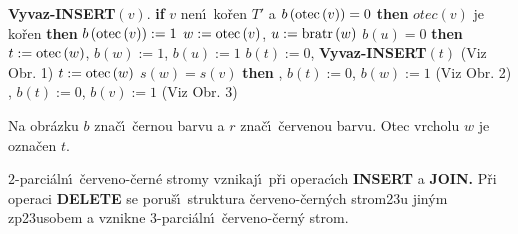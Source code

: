 {\bf Vyvaz-INSERT$\left(v\right)$}.\newline 
{\bf if} $v$ nen\'\i\ ko\v ren $T'$ a $b\left(\operatorname{otec}\left(v\right)\right)=0$ {\bf then}\newline 
\phantom{---}{\bf if} $otec\left(v\right)$ je ko\v ren {\bf then}\newline 
\phantom{------}$b\left(\operatorname{otec}\left(v\right)\right):=1$\newline 
\phantom{---}{\bf else}\newline 
\phantom{------}$w:=\operatorname{otec}\left(v\right)$, $u:=\operatorname{bratr}\left(w\right)$\newline 
\phantom{------}{\bf if} $b\left(u\right)=0$ {\bf then}\newline 
\phantom{---------}$t:=\operatorname{otec}\left(w\right)$, $b\left(w\right):=1$, $b\left(u\right):=1$\newline 
\phantom{---------}$b\left(t\right):=0$, {\bf Vyvaz-INSERT$\left(t\right)$} (Viz Obr. 1)\newline 
\phantom{------}{\bf else}\newline 
\phantom{---------}$t:=\operatorname{otec}\left(w\right)$\newline 
\phantom{---------}{\bf if} $s\left(w\right)=s\left(v\right)$ {\bf then}\newline 
\phantom{------------}{\bf Rotace$\left(t,w\right)$}, $b\left(t\right):=0$, $b\left(w\right):=1$ (Viz Obr. 2)\newline 
\phantom{---------}{\bf else}\newline 
\phantom{------------}{\bf Dvojita-rotace$\left(t,w,v\right)$}, $b\left(t\right):=0$, $b\left(v\right):=1$ (Viz Obr. 3)\newline 
\phantom{---------}{\bf endif}\newline 
\phantom{------}{\bf endif}\newline 
\phantom{---}{\bf endif\newline 
endif}
\medskip

\flushpar Na obr\'azku $b$ zna\v c\'\i\ \v cernou barvu a $r$ zna\v c\'\i\ \v cervenou 
barvu. Otec vrcholu $w$ je ozna\v cen $t$. 
\medskip

\midinsert
\centerline{}
\endcaption
\endinsert

\midinsert
\centerline{}
\endcaption
\endinsert
\newpage

\midinsert
\centerline{}
\endcaption
\endinsert

\flushpar$2$-parci\'aln\'\i\ \v cerveno-\v cern\'e stromy vznikaj\'\i\ p\v ri 
operac\'\i ch {\bf INSERT} a {\bf JOIN.}  P\v ri operaci {\bf DELETE} se poru\v s\'\i\ 
struktura \v cerveno-\v cern\'ych strom\accent23u jin\'ym 
zp\accent23usobem a vznikne 3-parci\'aln\'\i\ \v cerveno-\v cer\-n\'y strom.  
\medskip

